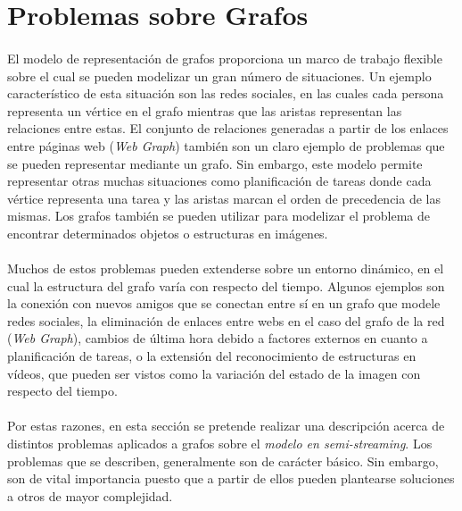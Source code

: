 \documentclass{subfiles}
\begin{document}
    \section{Problemas sobre Grafos}
    \label{sec:graph_problems}

      \paragraph{}
      El modelo de representación de grafos proporciona un marco de trabajo flexible sobre el cual se pueden modelizar un gran número de situaciones. Un ejemplo característico de esta situación son las redes sociales, en las cuales cada persona representa un vértice en el grafo mientras que las aristas representan las relaciones entre estas. El conjunto de relaciones generadas a partir de los enlaces entre páginas web (\emph{Web Graph}) también son un claro ejemplo de problemas que se pueden representar mediante un grafo. Sin embargo, este modelo permite representar otras muchas situaciones como planificación de tareas donde cada vértice representa una tarea y las aristas marcan el orden de precedencia de las mismas. Los grafos también se pueden utilizar para modelizar el problema de encontrar determinados objetos o estructuras en imágenes.

      \paragraph{}
      Muchos de estos problemas pueden extenderse sobre un entorno dinámico, en el cual la estructura del grafo varía con respecto del tiempo. Algunos ejemplos son la conexión con nuevos amigos que se conectan entre sí en un grafo que modele redes sociales, la eliminación de enlaces entre webs en el caso del grafo de la red (\emph{Web Graph}), cambios de última hora debido a factores externos en cuanto a planificación de tareas, o la extensión del reconocimiento de estructuras en vídeos, que pueden ser vistos como la variación del estado de la imagen con respecto del tiempo.

      \paragraph{}
      Por estas razones, en esta sección se pretende realizar una descripción acerca de distintos problemas aplicados a grafos sobre el \emph{modelo en semi-streaming}. Los problemas que se describen, generalmente son de carácter básico. Sin embargo, son de vital importancia puesto que a partir de ellos pueden plantearse soluciones a otros de mayor complejidad.
\end{document}
